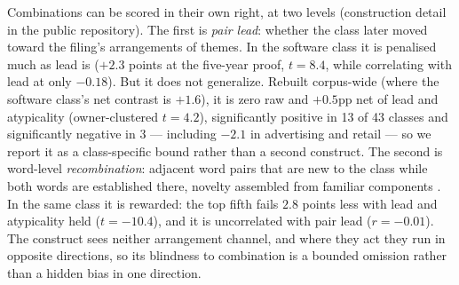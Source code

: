 Combinations can be scored in their own right, at two levels
(construction detail in the public repository). The first is
\emph{pair lead}: whether the class later moved toward the filing's
arrangements of themes. In the software class it is penalised much as
lead is ($+2.3$ points at the five-year proof, $t = 8.4$, while
correlating with lead at only $-0.18$). But it does not generalize.
Rebuilt corpus-wide (where the software class's net contrast is
$+1.6$), it is zero raw and $+0.5$pp net of lead and atypicality
(owner-clustered $t = 4.2$), significantly positive in 13 of 43 classes
and significantly negative in 3 --- including $-2.1$ in advertising and
retail --- so we report it as a class-specific bound rather than a second
construct. The second is word-level \emph{recombination}: adjacent word
pairs that are new to the class while both words are established there,
novelty assembled from familiar components
\citep{Fleming2001, Uzzi2013}. In the same class it is rewarded: the top
fifth fails $2.8$ points less with lead and atypicality held
($t = -10.4$), and it is uncorrelated with pair lead ($r = -0.01$). The
construct sees neither arrangement channel, and where they act they run
in opposite directions, so its blindness to combination is a bounded
omission rather than a hidden bias in one direction.

